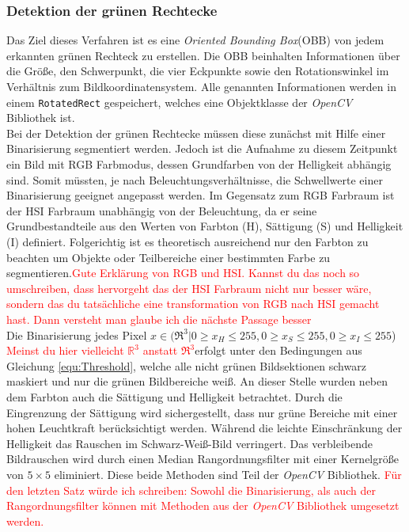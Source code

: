 \subsubsection{Detektion der grünen Rechtecke}\label{sec:GreenRects}
Das Ziel dieses Verfahren ist es eine \textit{Oriented Bounding Box}(OBB) von jedem erkannten grünen Rechteck zu erstellen. Die OBB beinhalten Informationen über die Größe, den Schwerpunkt, die vier Eckpunkte sowie den Rotationswinkel im Verhältnis zum Bildkoordinatensystem. Alle genannten Informationen werden in einem \texttt{RotatedRect} gespeichert, welches eine Objektklasse der \textit{OpenCV} Bibliothek ist.\\
Bei der Detektion der grünen Rechtecke müssen diese zunächst mit Hilfe einer Binarisierung segmentiert werden. Jedoch ist die Aufnahme zu diesem Zeitpunkt ein Bild mit RGB Farbmodus, dessen Grundfarben von der Helligkeit abhängig sind. Somit müssten, je nach Beleuchtungsverhältnisse, die Schwellwerte einer Binarisierung geeignet angepasst werden. Im Gegensatz zum RGB Farbraum ist der HSI Farbraum unabhängig von der Beleuchtung, da er seine Grundbestandteile aus den Werten von Farbton (H), Sättigung (S) und Helligkeit (I) definiert. Folgerichtig ist es theoretisch ausreichend nur den Farbton zu beachten um Objekte oder Teilbereiche einer bestimmten Farbe zu segmentieren.\textcolor{red}{Gute Erklärung von RGB und HSI. Kannst du das noch so umschreiben, dass hervorgeht das der HSI Farbraum nicht nur besser wäre, sondern das du tatsächliche eine transformation von RGB nach HSI gemacht hast. Dann versteht man glaube ich die nächste Passage besser}\\
Die Binarisierung jedes Pixel $x \in (\Re^3 | 0 \ge x_H \le 255, 0 \ge x_S \le 255, 0 \ge x_I \le 255$) \textcolor{red}{Meinst du hier vielleicht $\mathbb{R}^{3}$ anstatt $\Re^3$}erfolgt unter den Bedingungen aus Gleichung \ref{equ:Threshold}, welche alle nicht grünen Bildsektionen schwarz maskiert und nur die grünen Bildbereiche weiß. An dieser Stelle wurden neben dem Farbton auch die Sättigung und Helligkeit betrachtet. Durch die Eingrenzung der Sättigung wird sichergestellt, dass nur grüne Bereiche mit einer hohen Leuchtkraft berücksichtigt werden. Während die leichte Einschränkung der Helligkeit das Rauschen im Schwarz-Weiß-Bild verringert. Das verbleibende Bildrauschen wird durch einen Median Rangordnungsfilter mit einer Kernelgröße von $5\times5$ eliminiert. Diese beide Methoden sind Teil der \textit{OpenCV} Bibliothek. \textcolor{red}{Für den letzten Satz würde ich schreiben: Sowohl die Binarisierung, als auch der Rangordnungsfilter können mit Methoden aus der  \textit{OpenCV} Bibliothek umgesetzt werden.}

